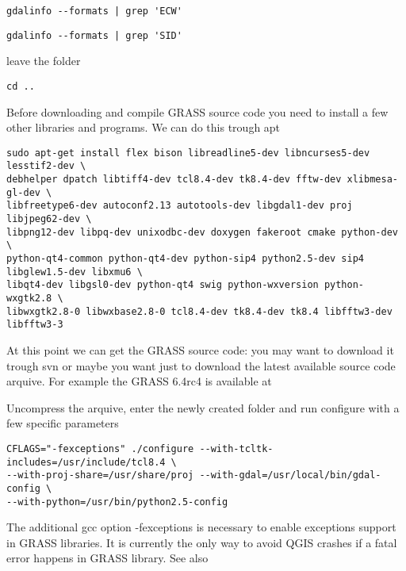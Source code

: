 \begin{verbatim}
gdalinfo --formats | grep 'ECW'
\end{verbatim}

\begin{verbatim}
gdalinfo --formats | grep 'SID'
\end{verbatim}

leave the folder 

\begin{verbatim}
cd ..
\end{verbatim}

Before downloading and compile GRASS source code you need to install a few
other libraries and programs. We can do this trough apt

\begin{verbatim}
sudo apt-get install flex bison libreadline5-dev libncurses5-dev lesstif2-dev \
debhelper dpatch libtiff4-dev tcl8.4-dev tk8.4-dev fftw-dev xlibmesa-gl-dev \
libfreetype6-dev autoconf2.13 autotools-dev libgdal1-dev proj libjpeg62-dev \
libpng12-dev libpq-dev unixodbc-dev doxygen fakeroot cmake python-dev \
python-qt4-common python-qt4-dev python-sip4 python2.5-dev sip4 libglew1.5-dev libxmu6 \
libqt4-dev libgsl0-dev python-qt4 swig python-wxversion python-wxgtk2.8 \
libwxgtk2.8-0 libwxbase2.8-0 tcl8.4-dev tk8.4-dev tk8.4 libfftw3-dev libfftw3-3
\end{verbatim}

At this point we can get the GRASS source code: you may want to download it
trough svn or maybe you want just to download the latest available source code arquive.
For example the GRASS 6.4rc4 is available at 

Uncompress the arquive, enter the newly created folder and run configure with a few specific parameters

\begin{verbatim}
CFLAGS="-fexceptions" ./configure --with-tcltk-includes=/usr/include/tcl8.4 \
--with-proj-share=/usr/share/proj --with-gdal=/usr/local/bin/gdal-config \
--with-python=/usr/bin/python2.5-config
\end{verbatim}

The additional gcc option -fexceptions is necessary to enable exceptions support in GRASS libraries. It is currently the only way to avoid QGIS crashes if a fatal error happens in GRASS library. See also 

